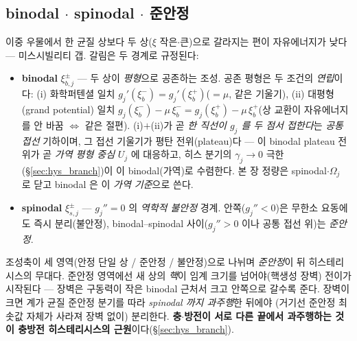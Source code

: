 \documentclass[11pt,a4paper]{article}
\begin{document}
\subsection{binodal $\cdot$ spinodal $\cdot$ 준안정}
이중 우물에서 한 균질 상보다 두 상($\xi$ 작은$\cdot$큰)으로 갈라지는 편이 자유에너지가 낮다 — 미스시빌리티 갭.
갈림은 두 경계로 규정된다:
\begin{itemize}[leftmargin=1.4em,itemsep=2pt]
\item \textbf{binodal} $\xi_{b,j}^\pm$ — 두 상이 \emph{평형}으로 공존하는 조성. 공존 평형은 두 조건의 \emph{연립}이다:
  (i) 화학퍼텐셜 일치 $g_j'(\xi_b^-)=g_j'(\xi_b^+)$($=\mu$, 같은 기울기), (ii) 대평형(grand potential) 일치
  $g_j(\xi_b^-)-\mu\,\xi_b^-=g_j(\xi_b^+)-\mu\,\xi_b^+$(상 교환이 자유에너지를 안 바꿈 $\Leftrightarrow$ 같은 절편).
  (i)$+$(ii)가 곧 \emph{한 직선이 $g_j$ 를 두 점서 접한다}는 \emph{공통 접선} 기하이며, 그 접선 기울기가 평탄
  전위(plateau)다 — 이 binodal plateau 전위가 곧 \emph{가역 평형 중심} $U_j$ 에 대응하고, 히스 분기의 $\gamma_j\to0$
  극한(\S\ref{sec:hys_branch})이 이 binodal(가역)로 수렴한다. 본 장 정량은 spinodal$\cdot$$\Omega_j$ 로 닫고 binodal 은
  이 \emph{가역 기준}으로 쓴다.
\item \textbf{spinodal} $\xi_{s,j}^\pm$ — $g_j''=0$ 의 \emph{역학적 불안정} 경계. 안쪽($g_j''<0$)은 무한소 요동에도
  즉시 분리(불안정), binodal--spinodal 사이($g_j''>0$ 이나 공통 접선 위)는 \emph{준안정}.
\end{itemize}
조성축이 세 영역(안정 단일 상 / 준안정 / 불안정)으로 나뉘며 \emph{준안정}이 뒤 히스테리시스의 무대다. 준안정
영역에선 새 상의 \emph{핵}이 임계 크기를 넘어야(핵생성 장벽) 전이가 시작된다 — 장벽은 구동력이 작은 binodal
근처서 크고 안쪽으로 갈수록 준다. 장벽이 크면 계가 균질 준안정 분기를 따라 \emph{spinodal 까지 과주행}한 뒤에야
(거기선 준안정 최솟값 자체가 사라져 장벽 없이) 분리한다. \textbf{충$\cdot$방전이 서로 다른 끝에서 과주행하는 것이
충방전 히스테리시스의 근원}이다(\S\ref{sec:hys_branch}).
\end{document}
